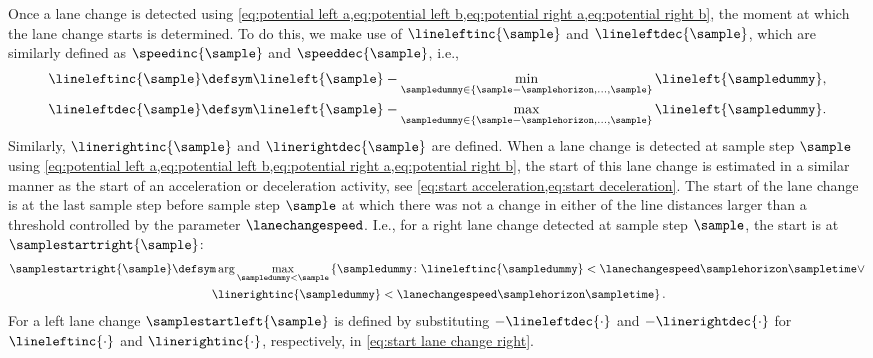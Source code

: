 Once a lane change is detected using \cref{eq:potential left a,eq:potential left b,eq:potential right a,eq:potential right b}, the moment at which the lane change starts is determined. To do this, we make use of $\lineleftinc{\sample}$ and $\lineleftdec{\sample}$, which are similarly defined as $\speedinc{\sample}$ and $\speeddec{\sample}$, i.e.,
\begin{align}
	\lineleftinc{\sample} \defsym \lineleft{\sample} - \min_{\sampledummy \in \left\{\sample-\samplehorizon, \ldots, \sample\right\}} \lineleft{\sampledummy}, \label{eq:line left inc}\\
	\lineleftdec{\sample} \defsym \lineleft{\sample} - \max_{\sampledummy \in \left\{\sample-\samplehorizon, \ldots, \sample\right\}} \lineleft{\sampledummy}. \label{eq:line left dec}
\end{align}
Similarly, $\linerightinc{\sample}$ and $\linerightdec{\sample}$ are defined. 
When a lane change is detected at sample step $\sample$ using \cref{eq:potential left a,eq:potential left b,eq:potential right a,eq:potential right b}, the start of this lane change is estimated in a similar manner as the start of an acceleration or deceleration activity, see \cref{eq:start acceleration,eq:start deceleration}. 
The start of the lane change is at the last sample step before sample step $\sample$ at which there was not a change in either of the line distances larger than a threshold controlled by the parameter $\lanechangespeed$. 
I.e., for a right lane change detected at sample step $\sample$, the start is at $\samplestartright{\sample}$:
\begin{multline} \label{eq:start lane change right}
	\samplestartright{\sample} \defsym \arg \max_{\sampledummy < \sample} \left\{ \sampledummy\colon \lineleftinc{\sampledummy} < \lanechangespeed\samplehorizon\sampletime \lor \right.\\
	\left. \linerightinc{\sampledummy} < \lanechangespeed\samplehorizon\sampletime \right\}.
\end{multline}
For a left lane change $\samplestartleft{\sample}$ is defined by substituting $-\lineleftdec{\cdot}$ and $-\linerightdec{\cdot}$ for $\lineleftinc{\cdot}$ and $\linerightinc{\cdot}$, respectively, in \cref{eq:start lane change right}.


